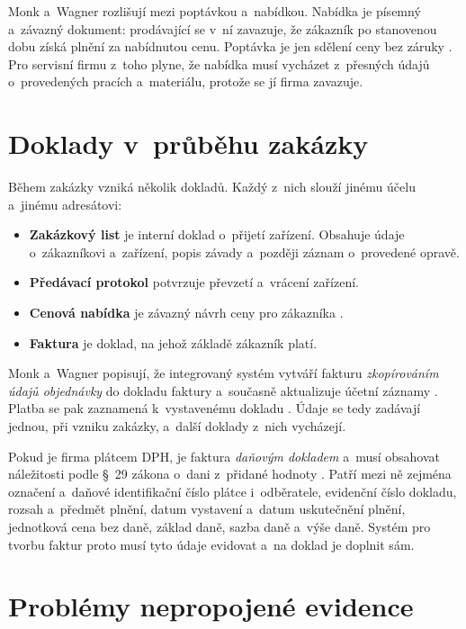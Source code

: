 Monk a~Wagner rozlišují mezi poptávkou a~nabídkou. Nabídka je písemný a~závazný dokument: prodávající se v~ní zavazuje, že zákazník po stanovenou dobu získá plnění za nabídnutou cenu. Poptávka je jen sdělení ceny bez záruky \cite[s.~56]{MonkWagner2013}. Pro servisní firmu z~toho plyne, že nabídka musí vycházet z~přesných údajů o~provedených pracích a~materiálu, protože se jí firma zavazuje.

\section{Doklady v~průběhu zakázky}\label{sec:zakazka-doklady}

Během zakázky vzniká několik dokladů. Každý z~nich slouží jinému účelu a~jinému adresátovi:
\begin{itemize}
\item \textbf{Zakázkový list} je interní doklad o~přijetí zařízení. Obsahuje údaje o~zákazníkovi a~zařízení, popis závady a~později záznam o~provedené opravě.
\item \textbf{Předávací protokol} potvrzuje převzetí a~vrácení zařízení.
\item \textbf{Cenová nabídka} je závazný návrh ceny pro zákazníka \cite[s.~56]{MonkWagner2013}.
\item \textbf{Faktura} je doklad, na jehož základě zákazník platí.
\end{itemize}

Monk a~Wagner popisují, že integrovaný systém vytváří fakturu \emph{zkopírováním údajů objednávky} do dokladu faktury a~současně aktualizuje účetní záznamy \cite[s.~57]{MonkWagner2013}. Platba se pak zaznamená k~vystavenému dokladu \cite[s.~57]{MonkWagner2013}. Údaje se tedy zadávají jednou, při vzniku zakázky, a~další doklady z~nich vycházejí.

Pokud je firma plátcem DPH, je faktura \emph{daňovým dokladem} a~musí obsahovat náležitosti podle §~29 zákona o~dani z~přidané hodnoty \cite{zakon-dph}. Patří mezi ně zejména označení a~daňové identifikační číslo plátce i~odběratele, evidenční číslo dokladu, rozsah a~předmět plnění, datum vystavení a~datum uskutečnění plnění, jednotková cena bez daně, základ daně, sazba daně a~výše daně. Systém pro tvorbu faktur proto musí tyto údaje evidovat a~na doklad je doplnit sám.

\section{Problémy nepropojené evidence}\label{sec:zakazka-problemy}


